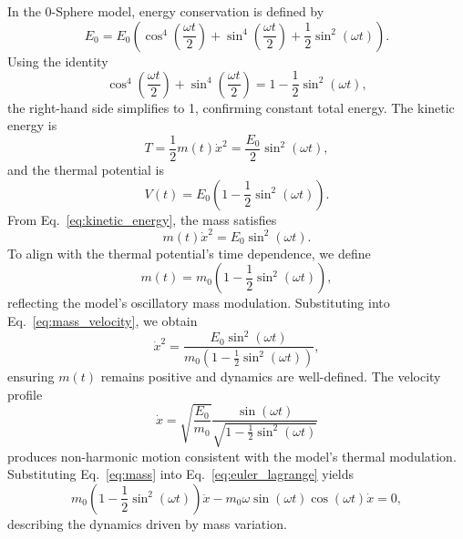 \documentclass[%
 reprint,
 amsmath,amssymb,
 aps,
]{revtex4-1}
\numberwithin{equation}{section}%
\begin{document}
In the 0-Sphere model, energy conservation is defined by~\cite{hanamura2018electron, hanamura2020dirac, hanamura2025bridging}
\begin{equation}
E_0 = E_0 \left( \cos^4 \left( \frac{\omega t}{2} \right) + \sin^4 \left( \frac{\omega t}{2} \right) + \frac{1}{2} \sin^2 (\omega t) \right).
\label{eq:energy_conservation}
\end{equation}
Using the identity
\begin{equation}
\cos^4 \left( \frac{\omega t}{2} \right) + \sin^4 \left( \frac{\omega t}{2} \right) = 1 - \frac{1}{2} \sin^2 (\omega t),
\end{equation}
the right-hand side simplifies to 1, confirming constant total energy. The kinetic energy is
\begin{equation}
T = \frac{1}{2} m(t) \dot{x}^2 = \frac{E_0}{2} \sin^2 (\omega t),
\label{eq:kinetic_energy}
\end{equation}
and the thermal potential is
\begin{equation}
V(t) = E_0 \left( 1 - \frac{1}{2} \sin^2 (\omega t) \right).
\label{eq:potential_energy}
\end{equation}
From Eq.~\eqref{eq:kinetic_energy}, the mass satisfies
\begin{equation}
m(t) \dot{x}^2 = E_0 \sin^2 (\omega t).
\label{eq:mass_velocity}
\end{equation}
To align with the thermal potential's time dependence, we define
\begin{equation}
m(t) = m_0 \left( 1 - \frac{1}{2} \sin^2 (\omega t) \right),
\label{eq:mass}
\end{equation}
reflecting the model's oscillatory mass modulation. Substituting into Eq.~\eqref{eq:mass_velocity}, we obtain
\begin{equation}
\dot{x}^2 = \frac{E_0 \sin^2 (\omega t)}{m_0 \left( 1 - \frac{1}{2} \sin^2 (\omega t) \right)},
\end{equation}
ensuring \( m(t) \) remains positive and dynamics are well-defined. The velocity profile
\begin{equation}
\dot{x} = \sqrt{\frac{E_0}{m_0}} \frac{\sin (\omega t)}{\sqrt{1 - \frac{1}{2} \sin^2 (\omega t)}}
\label{eq:velocity}
\end{equation}
produces non-harmonic motion consistent with the model's thermal modulation. Substituting Eq.~\eqref{eq:mass} into Eq.~\eqref{eq:euler_lagrange} yields
\begin{equation}
m_0 \left( 1 - \frac{1}{2} \sin^2 (\omega t) \right) \ddot{x} - m_0 \omega \sin (\omega t) \cos (\omega t) \dot{x} = 0,
\end{equation}
describing the dynamics driven by mass variation.
\end{document}
